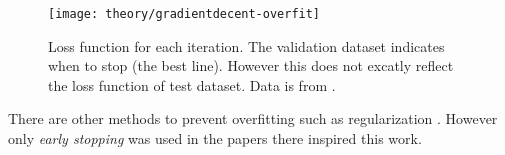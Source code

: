 \begin{figure}[h]
	\centering
	\texttt{[image: theory/gradientdecent-overfit]}
	\caption{Loss function for each iteration. The validation dataset indicates when to stop (the best line). However this does not excatly reflect the loss function of test dataset. Data is from \cite{alexgraves}.}
	\label{fig:theory:gradientdecent:overfit}
\end{figure}

There are other methods to prevent overfitting such as regularization \cite{the-elements-of-statistical-learning, bishop}. However only \textit{early stopping} was used in the papers there inspired this work.
